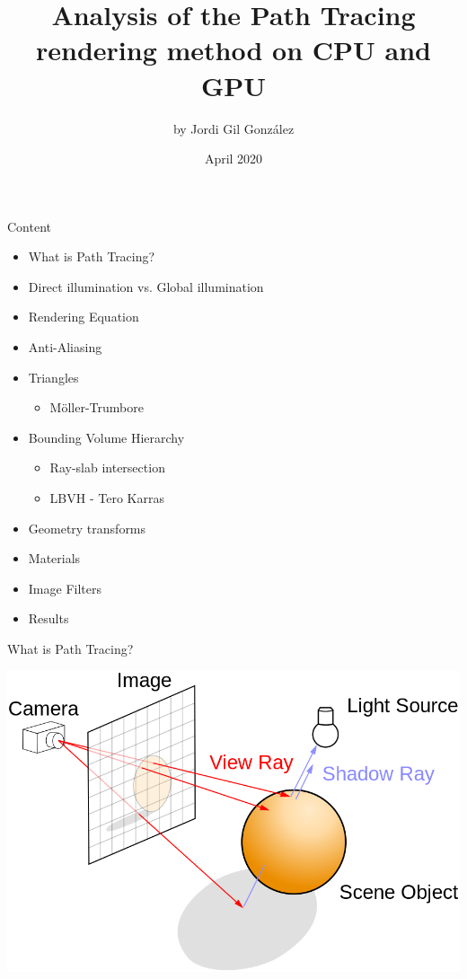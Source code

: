 \documentclass[xcolor=table]{beamer}
\title{Analysis of the Path Tracing rendering method on CPU and GPU}
\author{by Jordi Gil González}
\date{April 2020}
\begin{document}
\maketitle

\begin{frame}{Content}
	\begin{itemize}
		\item What is Path Tracing?
		\item Direct illumination vs. Global illumination
		\item Rendering Equation
		\item Anti-Aliasing
		\item Triangles
		\begin{itemize}
			\item Möller-Trumbore
		\end{itemize}
		\item Bounding Volume Hierarchy
		\begin{itemize}
			\item Ray-slab intersection
			\item LBVH - Tero Karras
		\end{itemize}
		\item Geometry transforms
		\item Materials
		\item Image Filters
		\item Results
	\end{itemize}
\end{frame}

\begin{frame}{What is Path Tracing?}

	\includegraphics[scale=0.35]{media/Ray_trace_diagram.png}

\end{frame}
\end{document}
